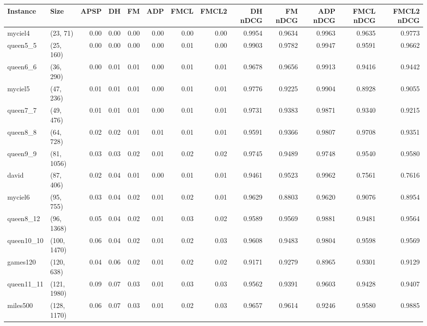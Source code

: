 \begin{tabular}{llrrrrrrrrrrr}
\toprule
  Instance &         Size &  APSP &   DH &   FM &  ADP &  FMCL &  FMCL2 &  DH nDCG &  FM nDCG &  ADP nDCG &  FMCL nDCG &  FMCL2 nDCG \\
\midrule
   myciel4 &     (23, 71) &  0.00 & 0.00 & 0.00 & 0.00 &  0.00 &   0.00 &   0.9954 &   0.9634 &    0.9963 &     0.9635 &      0.9773 \\
  queen5\_5 &    (25, 160) &  0.00 & 0.00 & 0.00 & 0.00 &  0.01 &   0.00 &   0.9903 &   0.9782 &    0.9947 &     0.9591 &      0.9662 \\
  queen6\_6 &    (36, 290) &  0.00 & 0.01 & 0.01 & 0.00 &  0.01 &   0.01 &   0.9678 &   0.9656 &    0.9913 &     0.9416 &      0.9442 \\
   myciel5 &    (47, 236) &  0.01 & 0.01 & 0.01 & 0.00 &  0.01 &   0.01 &   0.9776 &   0.9225 &    0.9904 &     0.8928 &      0.9055 \\
  queen7\_7 &    (49, 476) &  0.01 & 0.01 & 0.01 & 0.00 &  0.01 &   0.01 &   0.9731 &   0.9383 &    0.9871 &     0.9340 &      0.9215 \\
  queen8\_8 &    (64, 728) &  0.02 & 0.02 & 0.01 & 0.01 &  0.01 &   0.01 &   0.9591 &   0.9366 &    0.9807 &     0.9708 &      0.9351 \\
  queen9\_9 &   (81, 1056) &  0.03 & 0.03 & 0.02 & 0.01 &  0.02 &   0.02 &   0.9745 &   0.9489 &    0.9748 &     0.9540 &      0.9580 \\
     david &    (87, 406) &  0.02 & 0.04 & 0.01 & 0.00 &  0.01 &   0.01 &   0.9461 &   0.9523 &    0.9962 &     0.7561 &      0.7616 \\
   myciel6 &    (95, 755) &  0.03 & 0.04 & 0.02 & 0.01 &  0.02 &   0.01 &   0.9629 &   0.8803 &    0.9620 &     0.9076 &      0.8954 \\
 queen8\_12 &   (96, 1368) &  0.05 & 0.04 & 0.02 & 0.01 &  0.03 &   0.02 &   0.9589 &   0.9569 &    0.9881 &     0.9481 &      0.9564 \\
queen10\_10 &  (100, 1470) &  0.06 & 0.04 & 0.02 & 0.01 &  0.02 &   0.03 &   0.9608 &   0.9483 &    0.9804 &     0.9598 &      0.9569 \\
  games120 &   (120, 638) &  0.04 & 0.06 & 0.02 & 0.01 &  0.02 &   0.02 &   0.9171 &   0.9279 &    0.8965 &     0.9301 &      0.9129 \\
queen11\_11 &  (121, 1980) &  0.09 & 0.07 & 0.03 & 0.01 &  0.03 &   0.03 &   0.9562 &   0.9391 &    0.9603 &     0.9428 &      0.9407 \\
  miles500 &  (128, 1170) &  0.06 & 0.07 & 0.03 & 0.01 &  0.02 &   0.03 &   0.9657 &   0.9614 &    0.9246 &     0.9580 &      0.9885 \\

\end{tabular}
